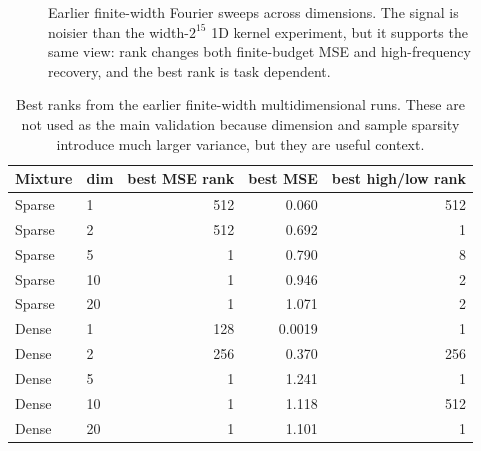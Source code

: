 \documentclass[10pt]{article}
\begin{document}
\begin{figure}[H]
\caption{Earlier finite-width Fourier sweeps across dimensions.  The signal is noisier than the width-$2^{15}$ 1D kernel experiment, but it supports the same view: rank changes both finite-budget MSE and high-frequency recovery, and the best rank is task dependent.}
\label{fig:app_multidim}
\end{figure}

\begin{table}[H]
\centering
\scriptsize
\setlength{\tabcolsep}{5pt}
\begin{tabular}{llrrr}
\toprule
Mixture & dim & best MSE rank & best MSE & best high/low rank\\
\midrule
Sparse & 1  & 512 & 0.060 & 512\\
Sparse & 2  & 512 & 0.692 & 1\\
Sparse & 5  & 1   & 0.790 & 8\\
Sparse & 10 & 1   & 0.946 & 2\\
Sparse & 20 & 1   & 1.071 & 2\\
Dense  & 1  & 128 & 0.0019 & 1\\
Dense  & 2  & 256 & 0.370 & 256\\
Dense  & 5  & 1   & 1.241 & 1\\
Dense  & 10 & 1   & 1.118 & 512\\
Dense  & 20 & 1   & 1.101 & 1\\
\bottomrule
\end{tabular}
\caption{Best ranks from the earlier finite-width multidimensional runs.  These are not used as the main validation because dimension and sample sparsity introduce much larger variance, but they are useful context.}
\label{tab:app_multidim}
\end{table}
\end{document}
